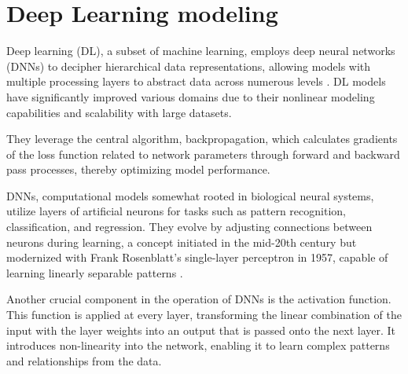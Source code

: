 \section{Deep Learning modeling}

Deep learning (DL), a subset of machine learning, employs deep neural networks (DNNs) to decipher hierarchical data representations, allowing models with multiple processing layers to abstract data across numerous levels \cite{LeCun2015DeepLearning, Sarker2021DeepDirections}. DL models have significantly improved various domains due to their nonlinear modeling capabilities and scalability with large datasets.

They leverage the central algorithm, backpropagation, which calculates gradients of the loss function related to network parameters through forward and backward pass processes, thereby optimizing model performance.



DNNs, computational models somewhat rooted in biological neural systems, utilize layers of artificial neurons for tasks such as pattern recognition, classification, and regression. They evolve by adjusting connections between neurons during learning, a concept initiated in the mid-20th century but modernized with Frank Rosenblatt's single-layer perceptron in 1957, capable of learning linearly separable patterns \cite{perceptron}.



Another crucial component in the operation of DNNs is the activation function. This function is applied at every layer, transforming the linear combination of the input with the layer weights into an output that is passed onto the next layer. It introduces non-linearity into the network, enabling it to learn complex patterns and relationships from the data.



\newpage